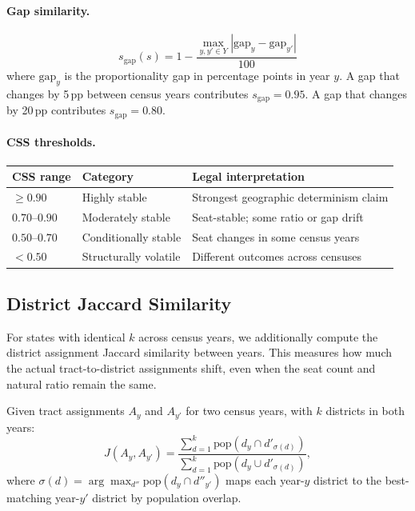 \paragraph{Gap similarity.}
\begin{equation}
  s_{\text{gap}}(s) = 1 - \frac{\max_{y,y' \in Y}
                         |\mathrm{gap}_{y} - \mathrm{gap}_{y'}|}{100}
\end{equation}
where $\mathrm{gap}_y$ is the proportionality gap in percentage points in year
$y$.
A gap that changes by 5\,pp between census years contributes
$s_{\text{gap}} = 0.95$.
A gap that changes by 20\,pp contributes $s_{\text{gap}} = 0.80$.

\paragraph{CSS thresholds.}
\begin{center}
\begin{tabular}{lll}
\toprule
CSS range & Category & Legal interpretation \\
\midrule
$\geq 0.90$ & Highly stable & Strongest geographic determinism claim \\
$0.70$--$0.90$ & Moderately stable & Seat-stable; some ratio or gap drift \\
$0.50$--$0.70$ & Conditionally stable & Seat changes in some census years \\
$< 0.50$ & Structurally volatile & Different outcomes across censuses \\
\bottomrule
\end{tabular}
\end{center}

\subsection{District Jaccard Similarity}
\label{sec:jaccard}

For states with identical $k$ across census years, we additionally compute
the district assignment Jaccard similarity between years.
This measures how much the actual tract-to-district assignments shift, even
when the seat count and natural ratio remain the same.

\begin{definition}
Given tract assignments $A_y$ and $A_{y'}$ for two census years, with
$k$ districts in both years:
\[
  J(A_y, A_{y'}) = \frac{\sum_{d=1}^{k} \text{pop}(d_y \cap d'_{\sigma(d)})}
                        {\sum_{d=1}^{k} \text{pop}(d_y \cup d'_{\sigma(d)})},
\]
where $\sigma(d) = \arg\max_{d''} \text{pop}(d_y \cap d''_{y'})$ maps each
year-$y$ district to the best-matching year-$y'$ district by population
overlap.
\end{definition}

